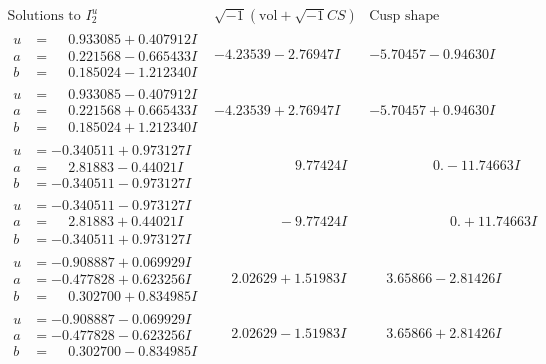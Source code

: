 \documentclass[1p]{elsarticle_modified}
\theoremstyle{definition}
\newcommand{\I}{\sqrt{-1}}
\begin{document}
$$\begin{array}{c|c|c}  
\text{Solutions to }I^u_{2}& \I (\text{vol} + \sqrt{-1}CS) & \text{Cusp shape}\\
 \hline 
\begin{aligned}
u &= \phantom{-}0.933085 + 0.407912 I \\
a &= \phantom{-}0.221568 - 0.665433 I \\
b &= \phantom{-}0.185024 - 1.212340 I\end{aligned}
 & -4.23539 - 2.76947 I & -5.70457 - 0.94630 I \\ \hline\begin{aligned}
u &= \phantom{-}0.933085 - 0.407912 I \\
a &= \phantom{-}0.221568 + 0.665433 I \\
b &= \phantom{-}0.185024 + 1.212340 I\end{aligned}
 & -4.23539 + 2.76947 I & -5.70457 + 0.94630 I \\ \hline\begin{aligned}
u &= -0.340511 + 0.973127 I \\
a &= \phantom{-}2.81883 - 0.44021 I \\
b &= -0.340511 - 0.973127 I\end{aligned}
 & \phantom{-0.000000 -}9.77424 I & \phantom{-0.000000 } 0. - 11.74663 I \\ \hline\begin{aligned}
u &= -0.340511 - 0.973127 I \\
a &= \phantom{-}2.81883 + 0.44021 I \\
b &= -0.340511 + 0.973127 I\end{aligned}
 & \phantom{-0.000000 } -9.77424 I & \phantom{-0.000000 -}0. + 11.74663 I \\ \hline\begin{aligned}
u &= -0.908887 + 0.069929 I \\
a &= -0.477828 + 0.623256 I \\
b &= \phantom{-}0.302700 + 0.834985 I\end{aligned}
 & \phantom{-}2.02629 + 1.51983 I & \phantom{-}3.65866 - 2.81426 I \\ \hline\begin{aligned}
u &= -0.908887 - 0.069929 I \\
a &= -0.477828 - 0.623256 I \\
b &= \phantom{-}0.302700 - 0.834985 I\end{aligned}
 & \phantom{-}2.02629 - 1.51983 I & \phantom{-}3.65866 + 2.81426 I \\ \hline\begin{aligned}

\end{aligned}
\end{array}$$
\end{document}
